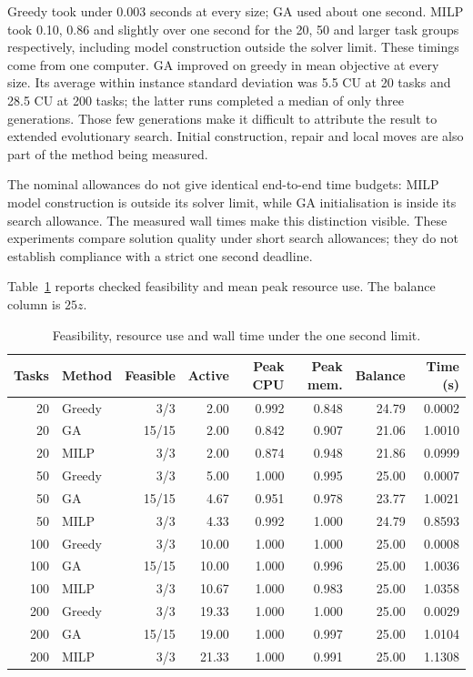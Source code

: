 \documentclass[10pt,a4paper]{article}
\begin{document}
Greedy took under 0.003 seconds at every size; GA used about one second. MILP
took 0.10, 0.86 and slightly over one second for the 20, 50 and larger task
groups respectively, including model construction outside the solver limit.
These timings come from one computer. GA improved on greedy in mean objective
at every size. Its average within instance standard deviation was 5.5 CU
at 20 tasks and 28.5 CU at 200 tasks; the latter runs completed a median
of only three generations.
Those few generations make it difficult to attribute the result to extended
evolutionary search. Initial construction, repair and local moves are also part
of the method being measured.

The nominal allowances do not give identical end-to-end time budgets:
MILP model construction is outside its solver limit, while GA initialisation
is inside its search allowance. The measured wall times make this distinction
visible. These experiments compare solution quality under short search
allowances; they do not establish compliance with a strict one second deadline.

Table~\ref{tab:resources} reports checked feasibility and mean peak resource
use. The balance column is $25z$.

\begin{table}[htbp]
\centering
\caption{Feasibility, resource use and wall time under the one second limit.}
\label{tab:resources}
\small
\begin{tabular}{rlrrrrrr}
\toprule
Tasks & Method & Feasible & Active & Peak CPU & Peak mem. & Balance & Time (s) \\
\midrule
20  & Greedy & 3/3   & 2.00  & 0.992 & 0.848 & 24.79 & 0.0002 \\
20  & GA     & 15/15 & 2.00  & 0.842 & 0.907 & 21.06 & 1.0010 \\
20  & MILP   & 3/3   & 2.00  & 0.874 & 0.948 & 21.86 & 0.0999 \\
50  & Greedy & 3/3   & 5.00  & 1.000 & 0.995 & 25.00 & 0.0007 \\
50  & GA     & 15/15 & 4.67  & 0.951 & 0.978 & 23.77 & 1.0021 \\
50  & MILP   & 3/3   & 4.33  & 0.992 & 1.000 & 24.79 & 0.8593 \\
100 & Greedy & 3/3   & 10.00 & 1.000 & 1.000 & 25.00 & 0.0008 \\
100 & GA     & 15/15 & 10.00 & 1.000 & 0.996 & 25.00 & 1.0036 \\
100 & MILP   & 3/3   & 10.67 & 1.000 & 0.983 & 25.00 & 1.0358 \\
200 & Greedy & 3/3   & 19.33 & 1.000 & 1.000 & 25.00 & 0.0029 \\
200 & GA     & 15/15 & 19.00 & 1.000 & 0.997 & 25.00 & 1.0104 \\
200 & MILP   & 3/3   & 21.33 & 1.000 & 0.991 & 25.00 & 1.1308 \\
\bottomrule
\end{tabular}
\end{table}
\end{document}
